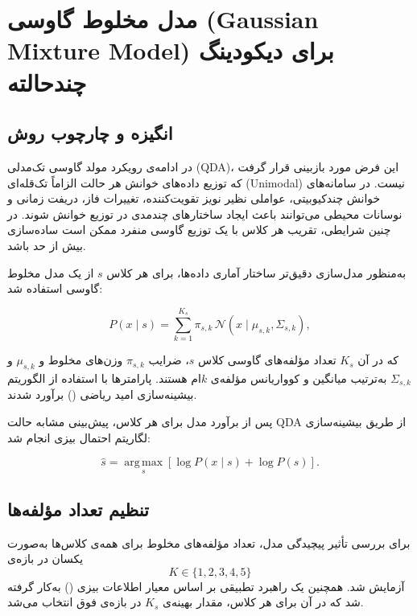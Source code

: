 \section{مدل مخلوط گاوسی (Gaussian Mixture Model) برای دیکودینگ چندحالته}

\subsection{انگیزه و چارچوب روش}

در ادامه‌ی رویکرد مولد گاوسی تک‌مدلی (QDA)، این فرض مورد بازبینی قرار گرفت که توزیع داده‌های خوانش هر حالت الزاماً تک‌قله‌ای (Unimodal) نیست. در سامانه‌های خوانش چندکیوبیتی، عواملی نظیر نویز تقویت‌کننده، تغییرات فاز، دریفت زمانی و نوسانات محیطی می‌توانند باعث ایجاد ساختارهای چندمدی در توزیع خوانش شوند. در چنین شرایطی، تقریب هر کلاس با یک توزیع گاوسی منفرد ممکن است ساده‌سازی بیش از حد باشد.

به‌منظور مدل‌سازی دقیق‌تر ساختار آماری داده‌ها، برای هر کلاس $s$ از یک مدل مخلوط گاوسی استفاده شد:

\begin{equation}
	P(x \mid s) = \sum_{k=1}^{K_s} \pi_{s,k}\,
	\mathcal{N}(x \mid \mu_{s,k}, \Sigma_{s,k}),
	\label{eq:gmm-class}
\end{equation}

که در آن $K_s$ تعداد مؤلفه‌های گاوسی کلاس $s$، ضرایب $\pi_{s,k}$ وزن‌های مخلوط و $\mu_{s,k}$ و $\Sigma_{s,k}$ به‌ترتیب میانگین و کوواریانس مؤلفه‌ی $k$ام هستند. پارامترها با استفاده از الگوریتم بیشینه‌سازی امید ریاضی () برآورد شدند.

پس از برآورد مدل برای هر کلاس، پیش‌بینی مشابه حالت QDA از طریق بیشینه‌سازی لگاریتم احتمال بیزی انجام شد:

\begin{equation}
	\hat{s} = \operatorname*{arg\,max}_{s}
	\left[ \log P(x \mid s) + \log P(s) \right].
\end{equation}

\subsection{تنظیم تعداد مؤلفه‌ها}

برای بررسی تأثیر پیچیدگی مدل، تعداد مؤلفه‌های مخلوط برای همه‌ی کلاس‌ها به‌صورت یکسان در بازه‌ی
\[
K \in \{1,2,3,4,5\}
\]
آزمایش شد. همچنین یک راهبرد تطبیقی بر اساس معیار اطلاعات بیزی () به‌کار گرفته شد که در آن برای هر کلاس، مقدار بهینه‌ی $K_s$ در بازه‌ی فوق انتخاب می‌شد.


